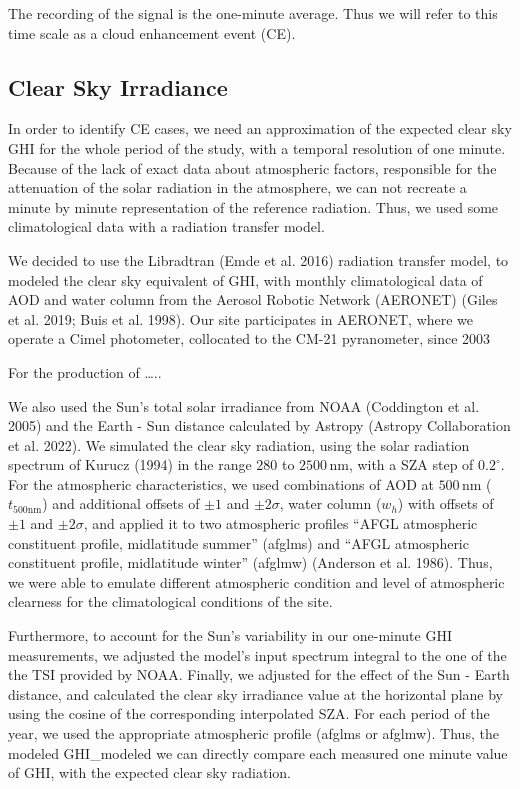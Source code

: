 \documentclass[
]{article}
\begin{document}
The recording of the signal is the one-minute average.
Thus we will refer to this time scale as a cloud enhancement event (CE).

\hypertarget{clear-sky-irradiance}{%
\subsection{Clear Sky Irradiance}\label{clear-sky-irradiance}}

In order to identify CE cases, we need an approximation of the expected clear sky GHI
for the whole period of the study, with a temporal resolution of one minute. Because
of the lack of exact data about atmospheric factors, responsible for the attenuation
of the solar radiation in the atmosphere, we can not recreate a minute by minute
representation of the reference radiation. Thus, we used some climatological data
with a radiation transfer model.

We decided to use the Libradtran (Emde et al. 2016) radiation transfer model, to modeled
the clear sky equivalent of GHI, with monthly climatological data of AOD and water
column from the Aerosol Robotic Network (AERONET) (Giles et al. 2019; Buis et al. 1998). Our site
participates in AERONET, where we operate a Cimel photometer, collocated to
the CM-21 pyranometer, since 2003

For the production of \ldots..

We also used the Sun's total solar irradiance from NOAA (Coddington et al. 2005) and the
Earth - Sun distance calculated by Astropy (Astropy Collaboration et al. 2022). We simulated
the clear sky radiation, using the solar radiation spectrum of Kurucz (1994) in the
range \(280\) to \(2500\,\text{nm}\), with a SZA step of \(0.2^\circ\). For the
atmospheric characteristics, we used combinations of AOD at \(500\,\text{nm}\)
(\(t_{500\text{nm}}\)) and additional offsets of \(\pm1\) and \(\pm2\sigma\), water column
(\(w_h\)) with offsets of \(\pm1\) and \(\pm2\sigma\), and applied it to two atmospheric
profiles ``AFGL atmospheric constituent profile, midlatitude summer'' (afglms) and
``AFGL atmospheric constituent profile, midlatitude winter'' (afglmw) (Anderson et al. 1986).
Thus, we were able to emulate different atmospheric condition and level of
atmospheric clearness for the climatological conditions of the site.

Furthermore, to account for the Sun's variability in our one-minute GHI measurements,
we adjusted the model's input spectrum integral to the one of the the TSI provided by
NOAA. Finally, we adjusted for the effect of the Sun - Earth distance, and
calculated the clear sky irradiance value at the horizontal plane by using the cosine
of the corresponding interpolated SZA. For each period of the year, we used the
appropriate atmospheric profile (afglms or afglmw). Thus, the modeled GHI\_modeled we
can directly compare each measured one minute value of GHI, with the expected clear
sky radiation.
\end{document}
